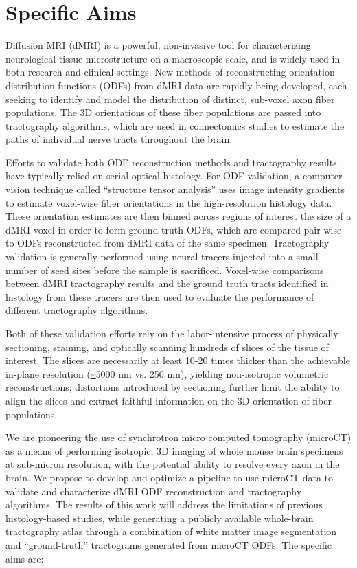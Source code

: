 \documentclass[11pt]{article}
\begin{document}
\section*{Specific Aims}
Diffusion MRI (dMRI) is a powerful, non-invasive tool for characterizing
neurological tissue microstructure on a macroscopic scale, and is widely used in
both research and clinical settings. New methods of reconstructing orientation
distribution functions (ODFs) from dMRI data are rapidly being developed, each
seeking to identify and model the distribution of distinct, sub-voxel axon fiber
populations. The 3D orientations of these fiber populations are passed into
tractography algorithms, which are used in connectomics studies to estimate the
paths of individual nerve tracts throughout the brain.

Efforts to validate both ODF reconstruction methods and tractography results
have typically relied on serial optical histology. For ODF validation, a
computer vision technique called ``structure tensor analysis'' uses image
intensity gradients to estimate voxel-wise fiber orientations in the
high-resolution histology data. These orientation estimates are then binned
across regions of interest the size of a dMRI voxel in order to form
ground-truth ODFs, which are compared pair-wise to ODFs reconstructed from dMRI
data of the same specimen. Tractography validation is generally performed using
neural tracers injected into a small number of seed sites before the sample is
sacrificed. Voxel-wise comparisons between dMRI tractography results and the
ground truth tracts identified in histology from these tracers are then used to
evaluate the performance of different tractography algorithms.

Both of these validation efforts rely on the labor-intensive process of
physically sectioning, staining, and optically scanning hundreds of slices of
the tissue of interest. The slices are necessarily at least 10-20 times thicker
than the achievable in-plane resolution (\url{~}5000 nm vs. 250 nm), yielding
non-isotropic volumetric reconstructions; distortions introduced by sectioning
further limit the ability to align the slices and extract faithful information
on the 3D orientation of fiber populations.

We are pioneering the use of synchrotron micro computed tomography (microCT) as
a means of performing isotropic, 3D imaging of whole mouse brain specimens at
sub-micron resolution, with the potential ability to resolve every axon in the
brain. We propose to develop and optimize a pipeline to use microCT data to
validate and characterize dMRI ODF reconstruction and tractography
algorithms. The results of this work will address the limitations of previous
histology-based studies, while generating a publicly available whole-brain
tractography atlas through a combination of white matter image segmentation and
``ground-truth'' tractograms generated from microCT ODFs. The specific aims are:
\end{document}
